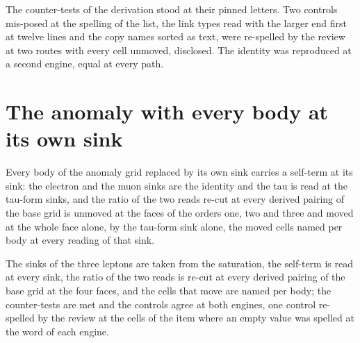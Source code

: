 \begin{chproof}
The counter-tests of the derivation stood at their pinned letters. Two controls mis-posed at the spelling of the list, the link types read with the larger end first at twelve lines and the copy names sorted as text, were re-spelled by the review at two routes with every cell unmoved, disclosed. The identity was reproduced at a second engine, equal at every path.
\end{chproof}
\section{The anomaly with every body at its own sink}\label{mod:IV-8-D538315-aebs-t1}
\begin{chtheorem}\label{box:IV-8-D538315-aebs-t1:1}
Every body of the anomaly grid replaced by its own sink carries a self-term at its sink: the electron and the muon sinks are the identity and the tau is read at the tau-form sinks, and the ratio of the two reads re-cut at every derived pairing of the base grid is unmoved at the faces of the orders one, two and three and moved at the whole face alone, by the tau-form sink alone, the moved cells named per body at every reading of that sink.
\end{chtheorem}
The sinks of the three leptons are taken from the saturation, the self-term is read at every sink, the ratio of the two reads is re-cut at every derived pairing of the base grid at the four faces, and the cells that move are named per body; the counter-tests are met and the controls agree at both engines, one control re-spelled by the review at the cells of the item where an empty value was spelled at the word of each engine.

